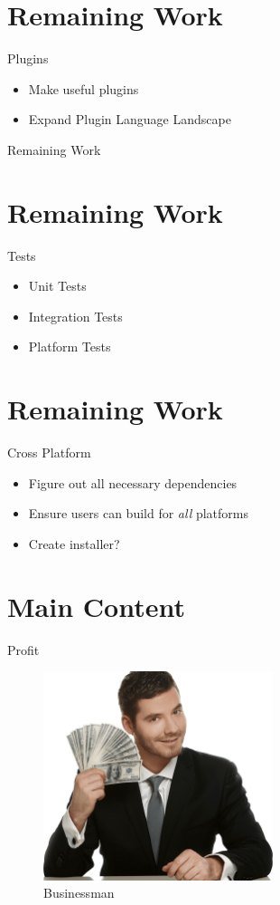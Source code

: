 \documentclass{beamer}
\begin{document}
\section{Remaining Work}
\begin{frame}{Plugins}
\begin{itemize}
  \item Make useful plugins
  \item Expand Plugin Language Landscape
\end{itemize}
\end{frame}

\begin{frame}{Remaining Work}
    \begin{figure}
        \centering
        
    \end{figure}
\end{frame}



\section{Remaining Work}
\begin{frame}{Tests}
\begin{itemize}
  \item Unit Tests
  \item Integration Tests
  \item Platform Tests
\end{itemize}
\end{frame}

\section{Remaining Work}
\begin{frame}{Cross Platform}
\begin{itemize}
  \item Figure out all necessary dependencies
  \item Ensure users can build for \textit{all} platforms
  \item Create installer?
\end{itemize}
\end{frame}

\section{Main Content}
\begin{frame}{Profit}
    \begin{figure}
        \centering
        \includegraphics[width=0.6\textwidth]{../../pics/grindset.png}
        \caption{Businessman}
    \end{figure}
\end{frame}
\end{document}
